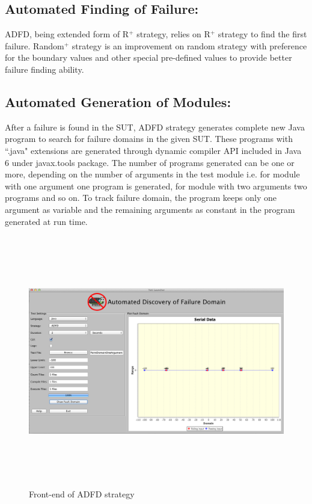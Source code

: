 \subsection{Automated Finding of Failure:}
ADFD, being extended form of R$^+$ strategy, relies on R$^+$ strategy to find the first failure. Random$^+$ strategy is an improvement on random strategy with preference for the boundary values and other special pre-defined values to provide better failure finding ability. %

\subsection{Automated Generation of Modules:}
After a failure is found in the SUT, ADFD strategy generates complete new Java program to search for failure domains in the given SUT.  These programs with ``.java" extensions are generated through dynamic compiler API included in Java 6 under javax.tools package. The number of programs generated can be one or more, depending on the number of arguments in the test module i.e. for module with one argument one program is generated, for module with two arguments two programs and so on. To track failure domain, the program keeps only one argument as variable and the remaining arguments as constant in the program generated at run time.

\begin{figure}[H]
\begin{center}
\includegraphics[width=15cm,height=11cm]{chapter5/ADFD_front_end.png}
\bigskip
\caption{Front-end of ADFD strategy}
\label{fig:ADFD-frontend}
\end{center}
\end{figure}
\bigskip

